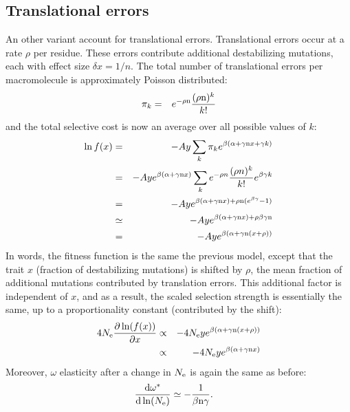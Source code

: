 \documentclass{article}
\begin{document}
\subsection{Translational errors}
An other variant account for translational errors. Translational errors occur at a rate $\rho$ per residue. These errors contribute additional destabilizing mutations, each with effect size $\delta x = 1/n$. The total number of translational errors per macromolecule is approximately Poisson distributed:
\begin{eqnarray}
\pi_k &=& e^{-\rho \text{n}} \frac{(\rho \text{n})^k}{k!}
\end{eqnarray}
and the total selective cost is now an average over all possible values of $k$:
\begin{eqnarray}
\ln f(x) &=& - A y \sum_k \pi_k e^{\beta(\alpha + \gamma\text{n} x + \gamma k)}
\\
&=& - A y  e^{\beta(\alpha + \gamma\text{n} x)} \sum_k e^{-\rho n} \frac{(\rho n)^k}{k!} e^{\beta \gamma k}
\\
&=& - A y  e^{\beta(\alpha + \gamma\text{n} x) + \rho \text{n} (e^{\beta \gamma} -1 )}
\\
& \simeq & - A y  e^{\beta(\alpha + \gamma\text{n} x) + \rho \beta \gamma \text{n}}
\\
& =& - A y  e^{\beta(\alpha + \gamma \text{n} (x + \rho))}
\end{eqnarray}
In words, the fitness function is the same the previous model, except that the trait $x$ (fraction of destabilizing mutations) is shifted by $\rho$, the mean fraction of additional mutations contributed by translation errors. This additional factor is independent of $x$, and as a result, the scaled selection strength is essentially the same, up to a proportionality constant (contributed by the shift):
\begin{eqnarray}
4 N_{\mathrm{e}} \frac{\partial \ln (f(x))}{\partial x} &\propto& -4 N_{\mathrm{e}} y e^{\beta(\alpha + \gamma \text{n} (x + \rho))}
\\ &\propto& -4 N_{\mathrm{e}} y e^{\beta(\alpha + \gamma\text{n} x)}
\end{eqnarray}
Moreover, $\omega$ elasticity after a change in $N_{\mathrm{e}}$ is again the same as before:
\begin{align}
\frac{ \mathrm{d} \omega^{*}}{\mathrm{d} \ln (N_{\mathrm{e}})} & \simeq - \frac{1}{\beta \text{n} \gamma}.
\end{align}
\end{document}
